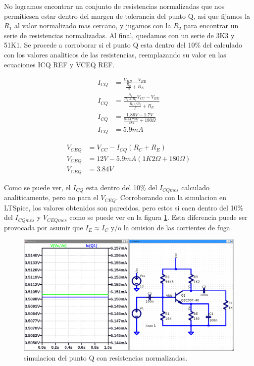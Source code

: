\documentclass[chaptersright]{informeutn}
\begin{document}
  No logramos encontrar un conjunto de resistencias normalizadas que nos permitiesen estar dentro del margen de
  tolerancia del punto Q, asi que fijamos la $R_1$ al valor normalizado mas cercano, y jugamos con la $R_2$ para
  encontrar un serie de resistencias normalizadas. Al final, quedamos con un serie de 3K3 y 51K1. Se procede a corroborar
  si el punto Q esta dentro del 10\% del calculado con los valores analiticos de las resistencias, reemplazando su
  valor en las ecuaciones \warn ICQ REF y VCEQ REF.

  \begin{figure}[!ht]
    \centering
    \begin{minipage}{0.49\textwidth}
      \begin{align*}
        I_{CQ} &= \frac{V_{BB} - V_{BE}}{\frac{R_B}{\beta} + R_E}\\[6pt]
        I_{CQ} &= \frac{\frac{R_1}{R_1 + R_2} V_{CC} - V_{BE}}{\frac{R_1//R_2}{\beta} + R_E}\\[6pt]
        I_{CQ} &= \frac{1.86V - 1.7V}{\frac{8444.79 \Omega}{484} + 180 \Omega}\\[6pt]
        I_{CQ} &= 5.9 mA
      \end{align*}
    \end{minipage}
    \begin{minipage}{0.49\textwidth}
      \begin{align*}
        V_{CEQ} &= V_{CC} - I_{CQ} \left(R_C + R_E \right)\\[6pt]
        V_{CEQ} &= 12V - 5.9mA \left(1K2 \Omega + 180 \Omega \right)\\[6pt]
        V_{CEQ} &= 3.84V
      \end{align*}
    \end{minipage}
  \end{figure}

  Como se puede ver, el $I_{CQ}$ esta dentro del 10\% del $I_{CQ mes}$ calculado analiticamente, pero no para el
  $V_{CEQ}$. Corroborando con la simulacion en LTSpice, los valores obtenidos son parecidos, pero estos si caen dentro
  del 10\% del $I_{CQ mes}$ y $V_{CEQ mes}$ como se puede ver en la figura \ref{fig:pto_q_normalizado}. Esta diferencia
  puede ser provocada por asumir que $I_E \approx I_C$ y/o la omision de las corrientes de fuga.

  \begin{figure}[!ht]
    \centering
    \includegraphics[width=.9\textwidth]{images/pto_q_normalizado.png}
    \caption{simulacion del punto Q con resistencias normalizadas.}
    \label{fig:pto_q_normalizado}
  \end{figure}
\end{document}
